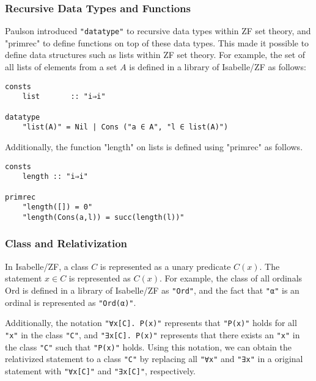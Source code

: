 \documentclass{report}
\newenvironment{isaframe}{\begin{mdframed}[topline=false, rightline=false, bottomline=false]}{\end{mdframed}}
\begin{document}
\subsubsection{Recursive Data Types and Functions}
Paulson \cite{paulson_datatype_impl} introduced \texttt{"datatype"} to recursive data types within ZF set theory, 
and "primrec" to define functions on top of these data types. 
This made it possible to define data structures such as lists within ZF set theory.
For example, the set of all lists of elements from a set $A$ is defined in a library of Isabelle/ZF as follows:
\begin{isaframe}
\begin{verbatim}
consts
    list       :: "i⇒i"

datatype
    "list(A)" = Nil | Cons ("a ∈ A", "l ∈ list(A)")
\end{verbatim}
\end{isaframe}
Additionally, the function "length" on lists is defined using "primrec" as follows.
\begin{isaframe}
\begin{verbatim}
consts
    length :: "i⇒i"

primrec
    "length([]) = 0"
    "length(Cons(a,l)) = succ(length(l))"
\end{verbatim}
\end{isaframe}

\subsubsection{Class and Relativization}
In Isabelle/ZF, a class $C$ is represented as a unary predicate $C(x)$.
The statement $x \in C$ is represented as $C(x)$.
For example, the class of all ordinals $\mathrm{Ord}$ is defined in a library of Isabelle/ZF as \texttt{"Ord"},
and the fact that \texttt{"α"} is an ordinal is represented as \texttt{"Ord(α)"}.

Additionally, the notation \texttt{"∀x[C]. P(x)"} represents that \texttt{"P(x)"} holds for all \texttt{"x"} in the class \texttt{"C"},
and \texttt{"∃x[C]. P(x)"} represents that there exists an \texttt{"x"} in the class \texttt{"C"} such that \texttt{"P(x)"} holds.
Using this notation, we can obtain the relativized statement to a class \texttt{"C"} 
by replacing all \texttt{"∀x"} and \texttt{"∃x"} in a original statement with \texttt{"∀x[C]"} and \texttt{"∃x[C]"}, respectively.
\end{document}
